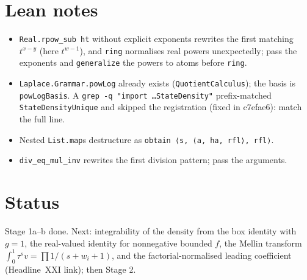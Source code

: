 \documentclass[11pt]{article}
\begin{document}
\section{Lean notes}
\begin{itemize}
\item \texttt{Real.rpow\_sub ht} without explicit exponents rewrites the first matching
  $t^{x-y}$ (here $t^{w-1}$), and \texttt{ring} normalises real powers unexpectedly; pass the exponents
  and \texttt{generalize} the powers to atoms before \texttt{ring}.
\item \texttt{Laplace.Grammar.powLog} already exists (\texttt{QuotientCalculus}); the basis is
  \texttt{powLogBasis}. A \texttt{grep -q "import …StateDensity"} prefix-matched \texttt{StateDensityUnique}
  and skipped the registration (fixed in c7efae6): match the full line.
\item Nested \texttt{List.map}s destructure as \texttt{obtain ⟨s, ⟨a, ha, rfl⟩, rfl⟩}.
\item \texttt{div\_eq\_mul\_inv} rewrites the first division pattern; pass the arguments.
\end{itemize}

\section{Status}
Stage 1a--b done. Next: integrability of the density from the box identity with $g=1$, the real-valued
identity for nonnegative bounded $f$, the Mellin transform $\int_0^1\tau^sv=\prod1/(s+w_i+1)$, and the
factorial-normalised leading coefficient (Headline~XXI link); then Stage 2.
\end{document}
